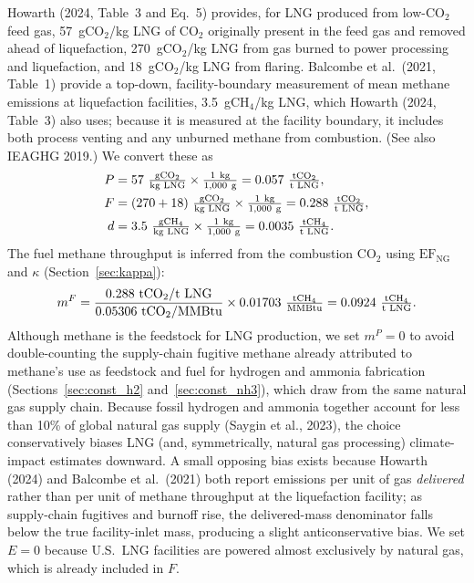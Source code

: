 \documentclass[11pt]{article}
\newcommand{\cotwo}{\ensuremath{\mathrm{CO_2}}}
\newcommand{\chfour}{\ensuremath{\mathrm{CH_4}}}
\begin{document}
Howarth (2024, Table~3 and Eq.~5) provides, for LNG produced from low-\cotwo{} feed gas, 57~g\cotwo{}/kg LNG of \cotwo{} originally present in the feed gas and removed ahead of liquefaction, 270~g\cotwo{}/kg LNG from gas burned to power processing and liquefaction, and 18~g\cotwo{}/kg LNG from flaring. Balcombe et al.\ (2021, Table~1) provide a top-down, facility-boundary measurement of mean methane emissions at liquefaction facilities, 3.5~g\chfour{}/kg LNG, which Howarth (2024, Table~3) also uses; because it is measured at the facility boundary, it includes both process venting and any unburned methane from combustion. (See also IEAGHG 2019.) We convert these as
%
\begin{align*}
  P &= 57~\tfrac{\text{g\cotwo{}}}{\text{kg LNG}} \times \tfrac{1~\text{kg}}{1{,}000~\text{g}} = 0.057~\tfrac{\text{t\cotwo{}}}{\text{t LNG}}, \\
  F &= (270 + 18)~\tfrac{\text{g\cotwo{}}}{\text{kg LNG}} \times \tfrac{1~\text{kg}}{1{,}000~\text{g}} = 0.288~\tfrac{\text{t\cotwo{}}}{\text{t LNG}}, \\
  d &= 3.5~\tfrac{\text{g\chfour{}}}{\text{kg LNG}} \times \tfrac{1~\text{kg}}{1{,}000~\text{g}} = 0.0035~\tfrac{\text{t\chfour{}}}{\text{t LNG}}.
\end{align*}
%
The fuel methane throughput is inferred from the combustion \cotwo{} using $\mathrm{EF}_{\text{NG}}$ and $\kappa$ (Section~\ref{sec:kappa}):
%
\[
  m^F = \frac{0.288~\text{t\cotwo{}/t LNG}}{0.05306~\text{t\cotwo{}/MMBtu}} \times 0.01703~\tfrac{\text{t\chfour{}}}{\text{MMBtu}} = 0.0924~\tfrac{\text{t\chfour{}}}{\text{t LNG}}.
\]
%
Although methane is the feedstock for LNG production, we set $m^P = 0$ to avoid double-counting the supply-chain fugitive methane already attributed to methane's use as feedstock and fuel for hydrogen and ammonia fabrication (Sections~\ref{sec:const_h2} and~\ref{sec:const_nh3}), which draw from the same natural gas supply chain. Because fossil hydrogen and ammonia together account for less than 10\% of global natural gas supply (Saygin et al., 2023), the choice conservatively biases LNG (and, symmetrically, natural gas processing) climate-impact estimates downward. A small opposing bias exists because Howarth (2024) and Balcombe et al.\ (2021) both report emissions per unit of gas \emph{delivered} rather than per unit of methane throughput at the liquefaction facility; as supply-chain fugitives and burnoff rise, the delivered-mass denominator falls below the true facility-inlet mass, producing a slight anticonservative bias. We set $E = 0$ because U.S.\ LNG facilities are powered almost exclusively by natural gas, which is already included in $F$.
\end{document}
